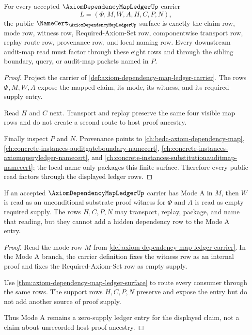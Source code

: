 \begin{theorem}
\label{thm:axiom-dependency-map-ledger-surface}
For every accepted $\AxiomDependencyMapLedgerUp$ carrier
$$
L=(\Phi,M,W,A,H,C,P,N),
$$
the public $\NameCert_{\AxiomDependencyMapLedgerUp}$ surface is exactly the claim row, mode row, witness row, Required-Axiom-Set row, componentwise transport row, replay route row, provenance row, and local naming row. Every downstream audit-map read must factor through these eight rows and through the sibling boundary, query, or audit-map packets named in $P$.
\end{theorem}
\begin{proof}
Project the carrier of \autoref{def:axiom-dependency-map-ledger-carrier}. The rows $\Phi,M,W,A$ expose the mapped claim, its mode, its witness, and its required-supply entry.

Read $H$ and $C$ next. Transport and replay preserve the same four visible map rows and do not create a second route to host proof ancestry.

Finally inspect $P$ and $N$. Provenance points to \autoref{ch:bedc-axiom-dependency-map}, \autoref{ch:concrete-instances-auditgateboundary-namecert}, \autoref{ch:concrete-instances-axiomqueryledger-namecert}, and \autoref{ch:concrete-instances-substitutionauditmap-namecert}; the local name only packages this finite surface. Therefore every public read factors through the displayed ledger rows.
\end{proof}

\begin{theorem}
\label{thm:axiom-dependency-map-ledger-mode-a}
If an accepted $\AxiomDependencyMapLedgerUp$ carrier has Mode A in $M$, then $W$ is read as an unconditional substrate proof witness for $\Phi$ and $A$ is read as empty required supply. The rows $H,C,P,N$ may transport, replay, package, and name that reading, but they cannot add a hidden dependency row to the Mode A entry.
\end{theorem}
\begin{proof}
Read the mode row $M$ from \autoref{def:axiom-dependency-map-ledger-carrier}. In the Mode A branch, the carrier definition fixes the witness row as an internal proof and fixes the Required-Axiom-Set row as empty supply.

Use \autoref{thm:axiom-dependency-map-ledger-surface} to route every consumer through the same rows. The support rows $H,C,P,N$ preserve and expose the entry but do not add another source of proof supply.

Thus Mode A remains a zero-supply ledger entry for the displayed claim, not a claim about unrecorded host proof ancestry.
\end{proof}

